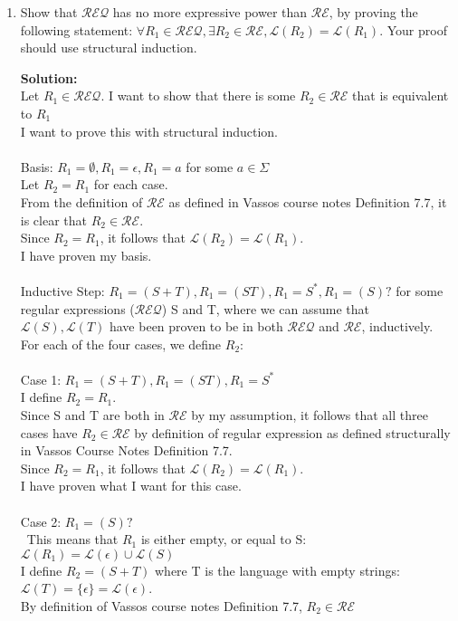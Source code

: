 \documentclass[boldsans]{article}
\newenvironment{solution}
{\bigskip \noindent \textbf{Solution: \\}}
{}
\newcommand{\RE}{\mathcal{RE}}
\newcommand{\REQ}{\mathcal{REQ}}
\renewcommand{\L}{\mathcal{L}}
\begin{document}
\begin{enumerate}
\begin{enumerate}
    \item Show that $\REQ$ has no more expressive power than $\RE$, by proving the following statement: $\forall R_1 \in \REQ, \exists R_2 \in \RE, \L(R_2) = \L(R_1)$. Your proof should use structural induction.
    
    \begin{solution}
    Let $R_1 \in \REQ$. I want to show that there is some $R_2 \in \RE$ that is equivalent to $R_1$\\
    I want to prove this with structural induction.\\
    \\
    Basis: $R_1 = \emptyset, R_1 = \epsilon, R_1 = a$ for some $a \in \Sigma$\\
    Let $R_2 = R_1$ for each case.\\
    From the definition of $\RE$ as defined in Vassos course notes Definition 7.7, it is clear that $R_2 \in \RE$.\\
    Since $R_2 = R_1$, it follows that $\L(R_2) = \L(R_1)$.\\
    I have proven my basis.\\
    \\
    Inductive Step: $R_1=(S+T), R_1=(ST), R_1=S^*, R_1=(S)?$ for some regular expressions ($\REQ$) S and T, where we can assume that $\L(S), \L(T)$ have been proven to be in both $\REQ$ and $\RE$, inductively. For each of the four cases, we define $R_2$:\\
    \\
    Case 1: $R_1=(S+T), R_1=(ST), R_1=S^*$\\
    I define $R_2 = R_1$.\\
    Since S and T are both in $\RE$ by my assumption, it follows that all three cases have $R_2 \in \RE$ by definition of regular expression as defined structurally in Vassos Course Notes Definition 7.7.\\
    Since $R_2 = R_1$, it follows that $\L(R_2) = \L(R_1)$.\\
    I have proven what I want for this case.\\
    \\
    Case 2: $R_1 = (S)?$\\\
    This means that $R_1$ is either empty, or equal to S: $\L(R_1) = \L(\epsilon) \cup \L(S)$\\
    I define $R_2 = (S+T)$ where T is the language with empty strings: $\L(T) = \{\epsilon\} = \L(\epsilon)$.\\
    By definition of Vassos course notes Definition 7.7, $R_2 \in \RE$\\

\end{solution}
\end{enumerate}
\end{enumerate}
\end{document}
